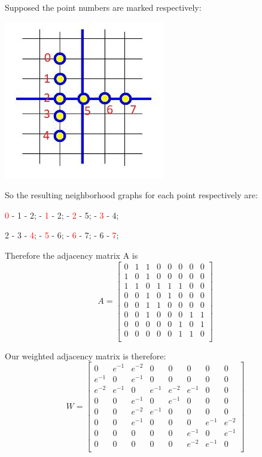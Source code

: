 \documentclass{article}
\begin{document}
Supposed the point numbers are marked respectively:

\begin{center}
\includegraphics{figure2.JPG}
\end{center}

So the resulting neighborhood graphs for each point respectively are:

\textcolor{red}{0} - 1 - 2;  - \textcolor{red}{1} - 2;  - \textcolor{red}{2} - 5;  - \textcolor{red}{3} - 4;

2 - 3 - \textcolor{red}{4};  - \textcolor{red}{5} - 6;  - \textcolor{red}{6} - 7;  - 6 - \textcolor{red}{7};

Therefore the adjacency matrix A is
\renewcommand{\arraystretch}{0.7}
$$
A = 
\begin{bmatrix}
0&1&1&0&0&0&0&0\\
1&0&1&0&0&0&0&0\\
1&1&0&1&1&1&0&0\\
0&0&1&0&1&0&0&0\\
0&0&1&1&0&0&0&0\\
0&0&1&0&0&0&1&1\\
0&0&0&0&0&1&0&1\\
0&0&0&0&0&1&1&0\\
\end{bmatrix}
$$

Our weighted adjacency matrix is therefore:
$$
W = 
\begin{bmatrix}
0&e^{-1}&e^{-2}&0&0&0&0&0\\
e^{-1}&0&e^{-1}&0&0&0&0&0\\
e^{-2}&e^{-1}&0&e^{-1}&e^{-2}&e^{-1}&0&0\\
0&0&e^{-1}&0&e^{-1}&0&0&0\\
0&0&e^{-2}&e^{-1}&0&0&0&0\\
0&0&e^{-1}&0&0&0&e^{-1}&e^{-2}\\
0&0&0&0&0&e^{-1}&0&e^{-1}\\
0&0&0&0&0&e^{-2}&e^{-1}&0\\
\end{bmatrix}
$$
\end{document}
